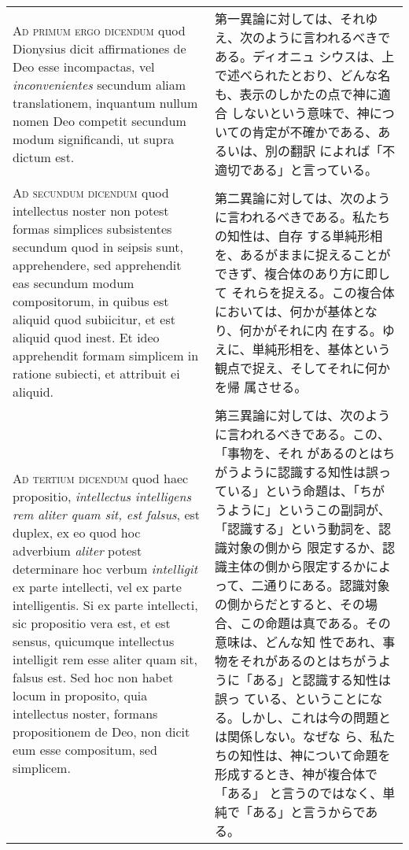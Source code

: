 \documentclass[10pt]{jsarticle}
\begin{document}
\begin{longtable}{p{21em}p{21em}}
{\scshape Ad primum ergo dicendum} quod Dionysius dicit affirmationes
de Deo esse incompactas, vel {\itshape inconvenientes} secundum aliam
translationem, inquantum nullum nomen Deo competit secundum modum
significandi, ut supra dictum est.

&

第一異論に対しては、それゆえ、次のように言われるべきである。ディオニュ
シウスは、上で述べられたとおり、どんな名も、表示のしかたの点で神に適合
しないという意味で、神についての肯定が不確かである、あるいは、別の翻訳
によれば「不適切である」と言っている。

\\

{\scshape Ad secundum dicendum} quod intellectus noster non potest
formas simplices subsistentes secundum quod in seipsis sunt,
apprehendere, sed apprehendit eas secundum modum compositorum, in
quibus est aliquid quod subiicitur, et est aliquid quod inest. Et ideo
apprehendit formam simplicem in ratione subiecti, et attribuit ei
aliquid.

&

第二異論に対しては、次のように言われるべきである。私たちの知性は、自存
する単純形相を、あるがままに捉えることができず、複合体のあり方に即して
それらを捉える。この複合体においては、何かが基体となり、何かがそれに内
在する。ゆえに、単純形相を、基体という観点で捉え、そしてそれに何かを帰
属させる。

\\

{\scshape Ad tertium dicendum} quod haec propositio, {\itshape
intellectus intelligens rem aliter quam sit, est falsus}, est duplex,
ex eo quod hoc adverbium {\itshape aliter} potest determinare hoc
verbum {\itshape intelligit} ex parte intellecti, vel ex parte
intelligentis. Si ex parte intellecti, sic propositio vera est, et est
sensus, quicumque intellectus intelligit rem esse aliter quam sit,
falsus est. Sed hoc non habet locum in proposito, quia intellectus
noster, formans propositionem de Deo, non dicit eum esse compositum,
sed simplicem.

&

第三異論に対しては、次のように言われるべきである。この、「事物を、それ
があるのとはちがうように認識する知性は誤っている」という命題は、「ちが
うように」というこの副詞が、「認識する」という動詞を、認識対象の側から
限定するか、認識主体の側から限定するかによって、二通りにある。認識対象
の側からだとすると、その場合、この命題は真である。その意味は、どんな知
性であれ、事物をそれがあるのとはちがうように「ある」と認識する知性は誤っ
ている、ということになる。しかし、これは今の問題とは関係しない。なぜな
ら、私たちの知性は、神について命題を形成するとき、神が複合体で「ある」
と言うのではなく、単純で「ある」と言うからである。


\end{longtable}
\end{document}
